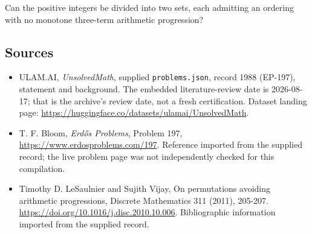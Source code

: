 \documentclass[11pt,a4paper]{article}
\begin{document}
Can the positive integers be divided into two sets, each admitting an ordering with no monotone three-term arithmetic progression?

\subsection{Sources}

{\small

\begin{itemize}

\item[\hypertarget{source:1988:1}{S1}] ULAM.AI, \emph{UnsolvedMath}, supplied \texttt{problems.json}, record 1988 (EP-197), statement and background. The embedded literature-review date is 2026-08-17; that is the archive’s review date, not a fresh certification. Dataset landing page: \url{https://huggingface.co/datasets/ulamai/UnsolvedMath}.

\item[\hypertarget{source:1988:2}{S2}] T. F. Bloom, \emph{Erdős Problems}, Problem 197, \url{https://www.erdosproblems.com/197}. Reference imported from the supplied record; the live problem page was not independently checked for this compilation.

\item[\hypertarget{source:1988:3}{S3}] Timothy D. LeSaulnier and Sujith Vijay, On permutations avoiding arithmetic progressions, Discrete Mathematics 311 (2011), 205-207. \url{https://doi.org/10.1016/j.disc.2010.10.006}. Bibliographic information imported from the supplied record.

\end{itemize}

}

\label{end:1988}
\end{document}
